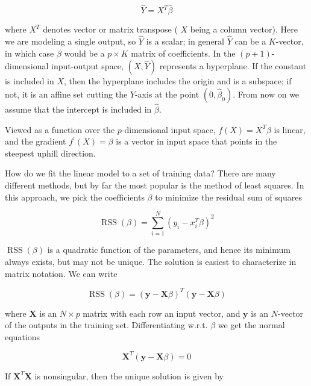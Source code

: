\documentclass[10pt]{article}
\begin{document}
\begin{equation*}
\hat{Y}=X^{T} \hat{\beta} \tag{2.2}
\end{equation*}


where $X^{T}$ denotes vector or matrix transpose ( $X$ being a column vector). Here we are modeling a single output, so $\hat{Y}$ is a scalar; in general $\hat{Y}$ can be a $K$-vector, in which case $\beta$ would be a $p \times K$ matrix of coefficients. In the $(p+1)$-dimensional input-output space, $(X, \hat{Y})$ represents a hyperplane. If the constant is included in $X$, then the hyperplane includes the origin and is a subspace; if not, it is an affine set cutting the $Y$-axis at the point $\left(0, \hat{\beta}_{0}\right)$. From now on we assume that the intercept is included in $\hat{\beta}$.

Viewed as a function over the $p$-dimensional input space, $f(X)=X^{T} \beta$ is linear, and the gradient $f^{\prime}(X)=\beta$ is a vector in input space that points in the steepest uphill direction.

How do we fit the linear model to a set of training data? There are many different methods, but by far the most popular is the method of least squares. In this approach, we pick the coefficients $\beta$ to minimize the residual sum of squares


\begin{equation*}
\operatorname{RSS}(\beta)=\sum_{i=1}^{N}\left(y_{i}-x_{i}^{T} \beta\right)^{2} \tag{2.3}
\end{equation*}


$\operatorname{RSS}(\beta)$ is a quadratic function of the parameters, and hence its minimum always exists, but may not be unique. The solution is easiest to characterize in matrix notation. We can write


\begin{equation*}
\operatorname{RSS}(\beta)=(\mathbf{y}-\mathbf{X} \beta)^{T}(\mathbf{y}-\mathbf{X} \beta) \tag{2.4}
\end{equation*}


where $\mathbf{X}$ is an $N \times p$ matrix with each row an input vector, and $\mathbf{y}$ is an $N$-vector of the outputs in the training set. Differentiating w.r.t. $\beta$ we get the normal equations


\begin{equation*}
\mathbf{X}^{T}(\mathbf{y}-\mathbf{X} \beta)=0 \tag{2.5}
\end{equation*}


If $\mathbf{X}^{T} \mathbf{X}$ is nonsingular, then the unique solution is given by
\end{document}
